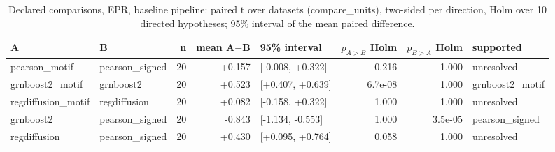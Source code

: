 \begin{table}[H]\centering\small
\caption{Declared comparisons, EPR, baseline pipeline: paired t over datasets (compare\_units), two-sided per direction, Holm over 10 directed hypotheses; 95\% interval of the mean paired difference.}
\begin{tabular}{llrrlrrl}\toprule
A & B & n & mean A$-$B & 95\% interval & $p_{A>B}$ Holm & $p_{B>A}$ Holm & supported \\ \midrule
pearson\_motif & pearson\_signed & 20 & +0.157 & [-0.008, +0.322] & 0.216 & 1.000 & unresolved \\
grnboost2\_motif & grnboost2 & 20 & +0.523 & [+0.407, +0.639] & 6.7e-08 & 1.000 & grnboost2\_motif \\
regdiffusion\_motif & regdiffusion & 20 & +0.082 & [-0.158, +0.322] & 1.000 & 1.000 & unresolved \\
grnboost2 & pearson\_signed & 20 & -0.843 & [-1.134, -0.553] & 1.000 & 3.5e-05 & pearson\_signed \\
regdiffusion & pearson\_signed & 20 & +0.430 & [+0.095, +0.764] & 0.058 & 1.000 & unresolved \\
\bottomrule\end{tabular}\end{table}

